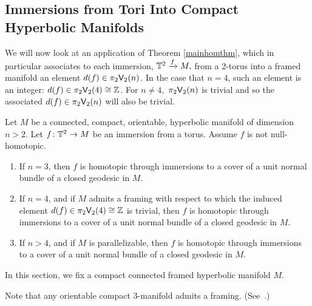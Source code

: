 \subsection{Immersions from Tori Into Compact Hyperbolic Manifolds}

We will now look at an application of Theorem \ref{mainhomthm}, which in particular associates to each immersion, $\mathbb T^2 \xrightarrow{f} M,$ from a 2-torus into a framed manifold an element $d(f) \in \pi_2\mathsf V_2(n)$.
In the case that $n=4$, such an element is an integer: $d(f) \in \pi_2\mathsf V_2(4)\cong \mathbb Z$. For $n \neq 4,$ $\pi_2\mathsf V_2(n)$ is trivial and so the associated $d(f) \in \pi_2\mathsf V_2(n)$ will also be trivial.


\begin{theorem}
\label{t2uni}
Let $M$ be a connected, compact, orientable, hyperbolic manifold of dimension $n>2$.
Let $f\colon \mathbb T^2 \to M$ be an immersion from a torus.
Assume $f$ is not null-homotopic.
\begin{enumerate}

\item
If $n=3$, then $f$ is homotopic through immersions to a cover of a unit normal bundle of a closed geodesic in $M$.


\item
If $n=4$, and if $M$ admits a framing with respect to which the induced element $d(f) \in \pi_2\mathsf V_2(4) \cong \mathbb Z$ is trivial, then $f$ is homotopic through immersions to a cover of a unit normal bundle of a closed geodesic in $M$. 


\item
If $n>4$, and if $M$ is parallelizable, then $f$ is homotopic through immersions to a cover of a unit normal bundle of a closed geodesic in $M$. 

\end{enumerate}


\end{theorem}



In this section, we fix a compact connected framed hyperbolic manifold $M$.

\begin{remark} \label{r3manifold}
Note that any orientable compact 3-manifold admits a framing.
(See~\cite{MilStash}.)
\end{remark}


